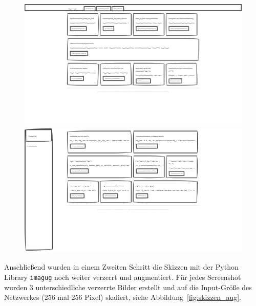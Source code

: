 \documentclass[pdftex,a4paper,halfparskip, article]{scrartcl}
\begin{document}
\begin{figure}
\centering
\begin{minipage}{.5\textwidth}
  \centering
  \includegraphics[width=0.8\linewidth]{skizze_1}
\end{minipage}%
\begin{minipage}{.5\textwidth}
  \centering
  \includegraphics[width=0.8\linewidth]{skizze_2}
\end{minipage}
  \label{fig:skizzen}
\end{figure}

Anschließend wurden in einem Zweiten Schritt die Skizzen mit der Python Library \texttt{imagug} noch weiter verzerrt und augmentiert. Für jedes Screenshot wurden 3 unterschiedliche verzerrte Bilder erstellt und auf die Input-Größe des Netzwerkes (256 mal 256 Pixel) skaliert, siehe Abbildung~\ref{fig:skizzen_aug}.
\end{document}
